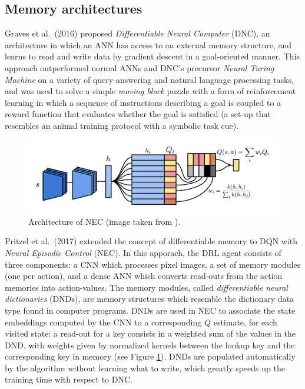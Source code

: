 \subsection{Memory architectures}
Graves et al.\ (2016) \cite{graves2016hybrid} proposed \textit{Differentiable 
Neural Computer} (DNC), an architecture in which an ANN has access to an 
external memory structure, and learns to read and write data by gradient descent
in a goal-oriented manner.
This approach outperformed normal ANNs and DNC's precursor \textit{Neural 
Turing Machine} \cite{gravesneural} on a variety of query-answering and natural 
language processing tasks, and was used to solve a simple \textit{moving block} 
puzzle with a form of reinforcement learning in which a sequence of instructions
describing a goal is coupled to a reward function that evaluates whether the 
goal is satisfied (a set-up that resembles an animal training protocol with a 
symbolic task cue).
%
\begin{figure}[h]
\includegraphics[width=\textwidth]{pictures/nec}
\centering
\caption[Architecture of NEC]{Architecture of NEC (image taken from 
			      \cite{pritzel2017neural}).}
\label{f:nec}
\end{figure}
%

Pritzel et al.\ (2017) \cite{pritzel2017neural} extended the concept of 
differentiable memory to DQN with \textit{Neural Episodic Control} (NEC). 
In this apporach, the DRL agent consists of three components: a CNN which 
processes pixel images, a set of memory modules (one per action), and a dense 
ANN which converts read-outs from the action memories into action-values. The 
memory modules, called \textit{differentiable neural dictionaries} (DNDs), are 
memory structures which resemble the dictionary data type found in computer 
programs. DNDs are used in NEC to associate the state embeddings computed by the
CNN to a corresponding $Q$ estimate, for each visited state: a read-out for a 
key consists in a weighted sum of the values in the DND, with weights given by 
normalized kernels between the lookup key and the corresponding key in memory 
(see Figure \ref{f:nec}). 
DNDs are populated automatically by the algorithm without learning what to write,
which greatly speeds up the training time with respect to DNC.

